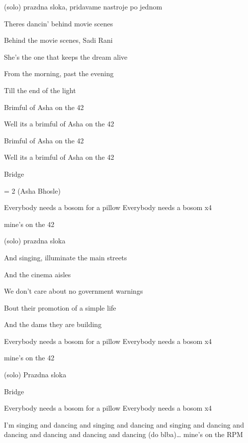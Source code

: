 
\zs
(solo) prazdna sloka, pridavame nastroje po jednom
\ks

\zs
Theres dancin' behind movie scenes 

Behind the movie scenes, Sadi Rani 

She's the one that keeps the dream alive 

From the morning, past the evening 

Till the end of the light
\ks

\zr
Brimful of Asha on the 42 

Well its a brimful of Asha on the 42 

Brimful of Asha on the 42 

Well its a brimful of Asha on the 42
\kr

Bridge

\zs
= 2 (Asha Bhosle)
\ks

\zr
\kr

Everybody needs a bosom for a pillow Everybody needs a bosom x4

mine's on the 42

\zs
(solo) prazdna sloka
\ks

\zs
And singing, illuminate the main streets

And the cinema aisles 

We don't care about no government warnings 

Bout their promotion of a simple life 

And the dams they are building
\ks

\zr
\kr

Everybody needs a bosom for a pillow Everybody needs a bosom x4

mine's on the 42

\zs
(solo) Prazdna sloka
\ks

Bridge

\zr
\kr

Everybody needs a bosom for a pillow Everybody needs a bosom x4

\zs
I'm singing and dancing
and singing and dancing
and singing and dancing
and dancing and dancing and dancing and dancing (do blba)… mine's on the RPM
\ks
\kp
